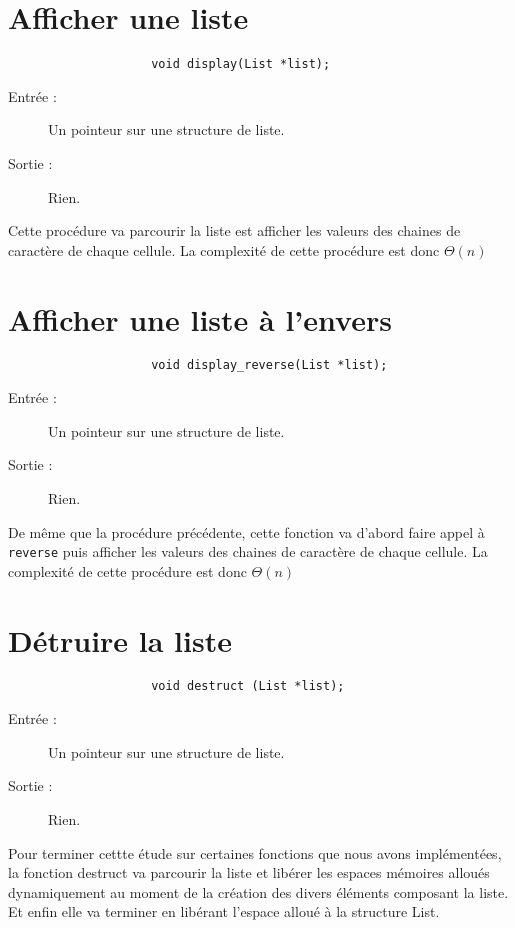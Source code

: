 \documentclass[a4paper, 12pt, leqno]{report}
\theoremstyle{plain}
\begin{document}
         \section{Afficher une liste}
                 \begin{verbatim}
                    void display(List *list);
                \end{verbatim}
                \begin{description}
                    \item[Entrée :] Un pointeur sur une structure de liste.
                    \item[Sortie :] Rien.
                \end{description}                
                Cette procédure va parcourir la liste est afficher les valeurs des chaines de caractère de chaque cellule. La complexité de cette procédure est donc $\Theta(n)$
         \section{Afficher une liste à l'envers}
                 \begin{verbatim}
                    void display_reverse(List *list);
                \end{verbatim}
                \begin{description}
                    \item[Entrée :] Un pointeur sur une structure de liste.
                    \item[Sortie :] Rien.
                \end{description}                
                De même que la procédure précédente, cette fonction va d'abord faire appel à \verb+reverse+ puis afficher les valeurs des chaines de caractère de chaque cellule. La complexité de cette procédure est donc $\Theta(n)$ 
         \section{Détruire la liste}
                 \begin{verbatim}
                    void destruct (List *list);
                \end{verbatim}
                \begin{description}
                    \item[Entrée :] Un pointeur sur une structure de liste.
                    \item[Sortie :] Rien.
                \end{description}                
                Pour terminer cettte étude sur certaines fonctions que nous avons implémentées, la fonction destruct va parcourir la liste et libérer les espaces mémoires alloués dynamiquement au moment de la création des divers éléments composant la liste. Et enfin elle va terminer en libérant l'espace alloué à la structure List.\\
                
\end{document}
